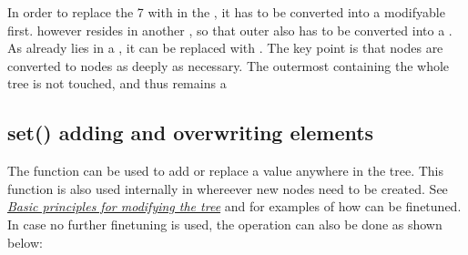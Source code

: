 \documentclass[a4paper,10pt,english]{sphinxmanual}
\begin{document}
\sphinxAtStartPar
In order to replace the 7 with  in the  , it has to be converted into a modifyable  first.  however resides in another  , so that outer  also has to be converted into a . As  already lies in a , it can be  replaced with \sphinxcode{\sphinxupquote{{[}5, {[}6, "seven"{]}{]}}}. The key point is that \sphinxhyphen{}nodes are converted to \sphinxhyphen{}nodes as deeply as necessary. The outermost  containing the whole tree  is not touched, and thus remains a 


\subsection{set() \textendash{} adding and overwriting elements}
\label{\detokenize{README:set-adding-and-overwriting-elements}}
\sphinxAtStartPar
The  function can be used to add or replace a value anywhere in the tree. This function is also used internally in  whereever new nodes need to be created. See {\hyperref[\detokenize{README:basic-principles-for-modifying-the-tree}]{\emph{Basic principles for modifying the tree}}} and {\hyperref[\detokenize{README:node_types}]{\emph{}}} for examples of how  can be fine\sphinxhyphen{}tuned. In case no further fine\sphinxhyphen{}tuning is used, the \sphinxhyphen{}operation can also be done as shown below:
\end{document}
